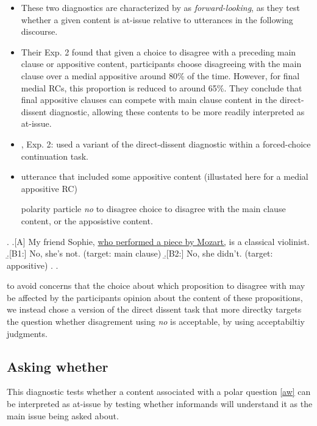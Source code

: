     \begin{itemize}
      \item These two diagnostics are characterized by \citealt{koev_notions_2018} as \emph{forward-looking}, as they test whether a given content is at-issue relative to utterances in the following discourse.


      \item \citealt{syrett_experimental_2015} Their Exp. 2 found that given a choice to disagree with a preceding main clause or appositive content, participants choose disagreeing with the main clause over a medial appositive around 80\% of the time. However, for final medial RCs, this proportion is reduced to around 65\%. They conclude that final appositive clauses can compete with main clause content in the direct-dissent diagnostic, allowing these contents to be more readily interpreted as at-issue.

      \item \citealt{syrett_experimental_2015}, Exp. 2: used a variant of the direct-dissent diagnostic within a forced-choice continuation task. 
      \item utterance that included some appositive content (illustated here for a medial appositive RC)

      polarity particle \emph{no} to disagree  choice to disagree with the main clause content, or the apposistive content.
    \end{itemize}

    \ex. \a.[A] My friend Sophie, \underline{who performed a piece by Mozart,} is a classical violinist.
      \b.[B1:] No, she’s not. (target: main clause)
      \b.[B2:] No, she didn’t. (target: appositive)
      \z. \z. 

      to avoid concerns that the choice about which proposition to disagree with may be affected by the participants opinion about the content of these propositions, we instead chose a version of the direct dissent task that more directky targets the question whether disagrement using \emph{no} is acceptable, by using acceptabiltiy judgments.

  \subsection{Asking whether}
    This diagnostic tests whether a content associated with a polar question \ref{aw} can be interpreted as at-issue by testing whether informands will understand it as the main issue being asked about.

